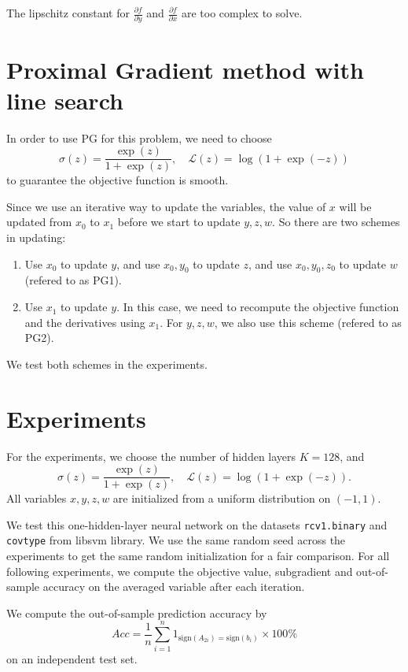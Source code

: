 \documentclass{article}
\numberwithin{equation}{section}
\numberwithin{figure}{section}
\begin{document}
The lipschitz constant for $\frac{\partial f}{\partial y}$ and $\frac{\partial f}{\partial x}$ are too complex to solve. 

\section{Proximal Gradient method with line search}
In order to use PG for this problem, we need to choose 
\begin{equation}
\sigma(z) = \frac{\exp(z)}{1+\exp(z)}, \quad \mathcal{L}(z) = \log(1+\exp(-z))
\end{equation}
to guarantee the objective function is smooth.

Since we use an iterative way to update the variables, the value of $x$ will be updated from $x_0 $ to $x_1 $ before we start to update $y, z, w$. So there are two schemes in updating:
\begin{enumerate}
\item Use $x_0 $ to update $y$, and use $x_0, y_0 $ to update $z$, and use $x_0, y_0, z_0 $ to update $w$ (refered to as PG1).
\item Use $x_1 $ to update $y$. In this case, we need to recompute the objective function and the derivatives using $ x_1 $. For $y, z, w$, we also use this scheme (refered to as PG2).
\end{enumerate}
We test both schemes in the experiments.

\section{Experiments}
For the experiments, we choose the number of hidden layers $K = 128$, and
\begin{equation}
\sigma(z) = \frac{\exp(z)}{1+\exp(z)}, \quad \mathcal{L}(z) = \log(1+\exp(-z)).
\end{equation}
All variables $x, y, z, w$ are initialized from a uniform distribution on $(-1, 1)$. 

We test this one-hidden-layer neural network on the datasets \texttt{rcv1.binary} and \texttt{covtype} from libsvm library. We use the same random seed across the experiments to get the same random initialization for a fair comparison. For all following experiments, we compute the objective value, subgradient and out-of-sample accuracy on the averaged variable after each iteration.

We compute the out-of-sample prediction accuracy by
\begin{equation}
Acc = \frac{1}{n}\sum_{i=1}^{n} 1_{\text{sign}(A_{2i}) = \text{sign}(b_i)} \times 100\%
\end{equation}
on an independent test set.
\end{document}
